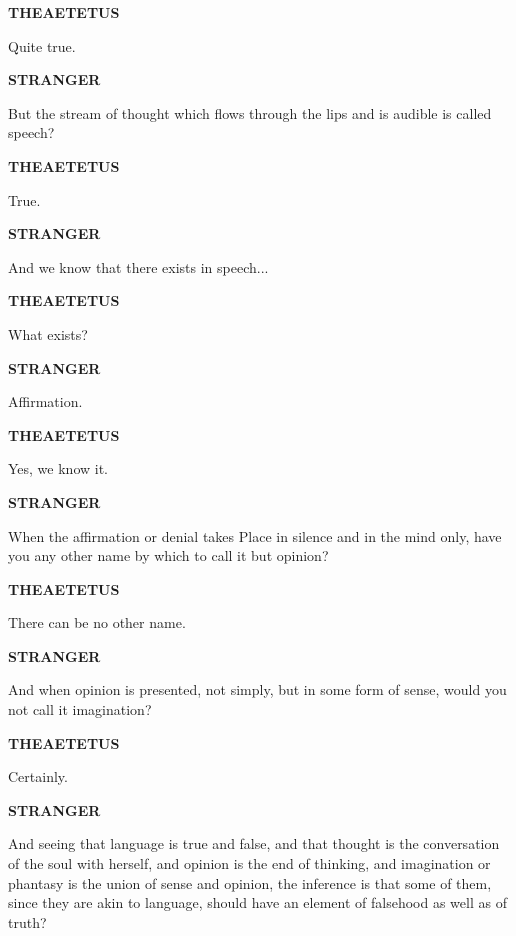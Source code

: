 \documentclass[11pt,letter]{article}
\begin{document}
\par \textbf{THEAETETUS}
\par   Quite true.

\par \textbf{STRANGER}
\par   But the stream of thought which flows through the lips and is audible is called speech?

\par \textbf{THEAETETUS}
\par   True.

\par \textbf{STRANGER}
\par   And we know that there exists in speech...

\par \textbf{THEAETETUS}
\par   What exists?

\par \textbf{STRANGER}
\par   Affirmation.

\par \textbf{THEAETETUS}
\par   Yes, we know it.

\par \textbf{STRANGER}
\par   When the affirmation or denial takes Place in silence and in the mind only, have you any other name by which to call it but opinion?

\par \textbf{THEAETETUS}
\par   There can be no other name.

\par \textbf{STRANGER}
\par   And when opinion is presented, not simply, but in some form of sense, would you not call it imagination?

\par \textbf{THEAETETUS}
\par   Certainly.

\par \textbf{STRANGER}
\par   And seeing that language is true and false, and that thought is the conversation of the soul with herself, and opinion is the end of thinking, and imagination or phantasy is the union of sense and opinion, the inference is that some of them, since they are akin to language, should have an element of falsehood as well as of truth?
\end{document}

